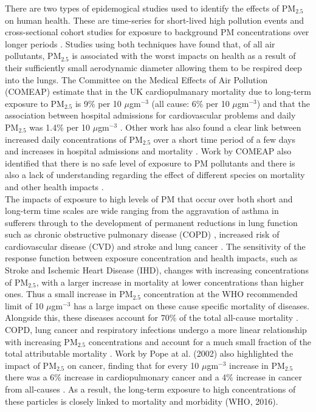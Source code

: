 \documentclass[10pt]{article}
\begin{document}
There are two types of epidemogical studies used to identify the effects of PM$_{2.5}$ on human health. These are time-series for short-lived high pollution events and cross-sectional cohort studies for exposure to background PM concentrations over longer periods \cite{Heal2012}. Studies using both techniques have found that, of all air pollutants, PM$_{2.5}$ is associated with the worst impacts on health as a result of their sufficiently small aerodynamic diameter allowing them to be respired deep into the lungs. The Committee on the Medical Effects of Air Pollution (COMEAP) estimate that in the UK cardiopulmanary mortality due to long-term exposure to PM$_{2.5}$ is  9\% per 10 ${\mu}$gm$^{-3}$ (all cause: 6\% per 10 ${\mu}$gm$^{-3}$) and that the association between hospital admissions for cardiovascular problems and daily PM$_{2.5}$ was 1.4\% per 10 ${\mu}$gm$^{-3}$ \cite{Comeap}. Other work has also found a clear link between increased daily concentrations of PM$_{2.5}$ over a short time period of a few days and increases in hospital admissions and mortality \cite{Atkinson2015}. Work by COMEAP also identified that there is no safe level of exposure to PM pollutants and there is also a lack of understanding regarding the effect of different species on mortality and other health impacts \cite{Coemap}.\\

The impacts of exposure to high levels of PM that occur over both short and long-term time scales are wide ranging from the aggravation of asthma in sufferers through to the development of permanent reductions in lung function such as chronic obstructive pulmonary disease (COPD) \cite{HOC2009}, increased risk of cardiovascular disease (CVD) \cite{Yu2010} and stroke and lung cancer \cite{Apte2015}. The sensitivity of the response function between exposure concentration and health impacts, such as Stroke and Ischemic Heart Disease (IHD), changes with increasing concentrations of PM$_{2.5}$, with a larger increase in mortality at lower concentrations than higher ones. Thus a small increase in PM$_{2.5}$ concentration at the WHO recommended limit of 10 ${\mu}$gm$^{-3}$ has a large impact on these cause specific mortality of diseases. Alongside this, these diseases account for 70\% of the total all-cause mortality \cite{Apte2015}. COPD, lung cancer and respiratory infections undergo a more linear relationship with increasing PM$_{2.5}$ concentrations and account for a much small fraction of the total attributable mortality \cite{Apte2015}. Work by Pope at al. (2002) also highlighted the impact of PM$_{2.5}$ on cancer, finding that for every 10 ${\mu}$gm$^{-3}$  increase in PM$_{2.5}$ there was a 6\% increase in cardiopulmonary cancer and a 4\% increase in cancer from all-causes \cite{Yu2010}. As a result, the long-term exposure to high concentrations of these particles is closely linked to mortality and morbidity (WHO, 2016).\\
\end{document}
